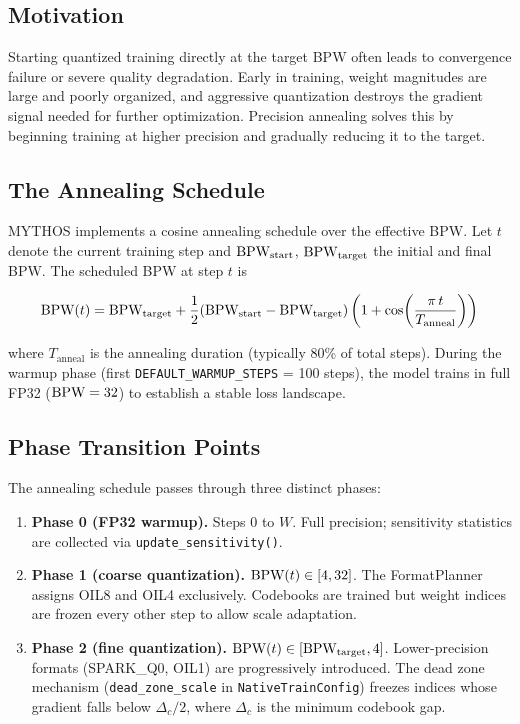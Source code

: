 \subsection{Motivation}

Starting quantized training directly at the target BPW often leads to
convergence failure or severe quality degradation.  Early in training,
weight magnitudes are large and poorly organized, and aggressive
quantization destroys the gradient signal needed for further
optimization.  Precision annealing solves this by beginning training at
higher precision and gradually reducing it to the target.

\subsection{The Annealing Schedule}

MYTHOS implements a cosine annealing schedule over the effective BPW.
Let $t$ denote the current training step and
$\textnormal{BPW}_{\text{start}}$, $\textnormal{BPW}_{\text{target}}$ the initial and final
BPW.  The scheduled BPW at step $t$ is

\begin{equation}
\textnormal{BPW}(t) = \textnormal{BPW}_{\text{target}} + \frac{1}{2}
  (\textnormal{BPW}_{\text{start}} - \textnormal{BPW}_{\text{target}})
  \left(1 + \cos\!\left(\frac{\pi \, t}{T_{\text{anneal}}}\right)\right)
\label{eq:annealing_schedule}
\end{equation}

\noindent where $T_{\text{anneal}}$ is the annealing duration (typically
80\% of total steps).  During the warmup phase (first
\texttt{DEFAULT\_WARMUP\_STEPS} = 100 steps), the model trains in
full FP32 ($\textnormal{BPW} = 32$) to establish a stable loss landscape.

\subsection{Phase Transition Points}

The annealing schedule passes through three distinct phases:

\begin{enumerate}
    \item \textbf{Phase 0 (FP32 warmup).} Steps $0$ to $W$.  Full
    precision; sensitivity statistics are collected via
    \texttt{update\_sensitivity()}.

    \item \textbf{Phase 1 (coarse quantization).}
    $\textnormal{BPW}(t) \in [4, 32]$.  The FormatPlanner assigns OIL8 and OIL4
    exclusively.  Codebooks are trained but weight indices are frozen
    every other step to allow scale adaptation.

    \item \textbf{Phase 2 (fine quantization).}
    $\textnormal{BPW}(t) \in [\textnormal{BPW}_{\text{target}}, 4]$.  Lower-precision formats
    (SPARK\_Q0, OIL1) are progressively introduced.  The dead zone
    mechanism (\texttt{dead\_zone\_scale} in
    \texttt{NativeTrainConfig}) freezes indices whose gradient falls
    below $\Delta_c / 2$, where $\Delta_c$ is the minimum codebook gap.
\end{enumerate}

